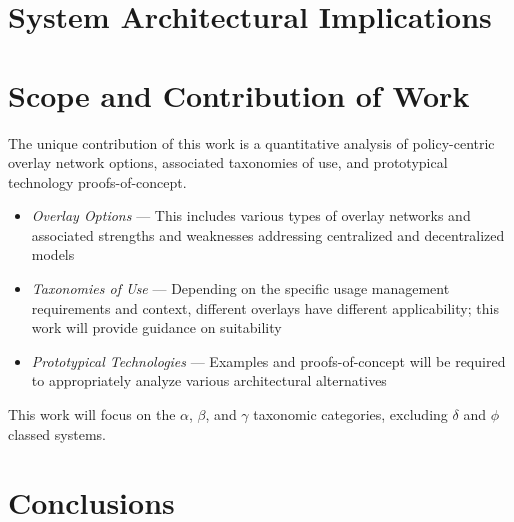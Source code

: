 \documentclass[12pt,letterpaper]{article}
\begin{document}
\section{System Architectural Implications}


\section{Scope and Contribution of Work}
The unique contribution of this work is a quantitative analysis of policy-centric overlay network options, associated taxonomies of use, and prototypical technology proofs-of-concept.
\begin{itemize}
\item \textit{Overlay Options} --- This includes various types of overlay networks and associated strengths and weaknesses addressing centralized and decentralized models
\item \textit{Taxonomies of Use} --- Depending on the specific usage management requirements and context, different overlays have different applicability; this work will provide guidance on suitability
\item \textit{Prototypical Technologies} --- Examples and proofs-of-concept will be required to appropriately analyze various architectural alternatives
\end{itemize}
This work will focus on the $\alpha$, $\beta$, and $\gamma$ taxonomic categories, excluding $\delta$ and $\phi$ classed systems.

\section{Conclusions}



\end{document}
